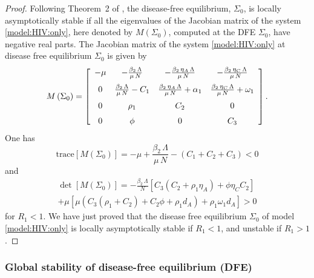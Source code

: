 \documentclass{my_aims}
\theoremstyle{definition}
\begin{document}
\begin{proof}
Following Theorem~2 of \cite{van:den:Driessche:2002}, the disease-free equilibrium,
$\Sigma_0$, is locally asymptotically stable if all the eigenvalues of the Jacobian
matrix of the system \eqref{model:HIV:only}, here denoted by $M\left(\Sigma_0\right)$,
computed at the DFE $\Sigma_0$, have negative real parts.
The Jacobian matrix of the system \eqref{model:HIV:only}
at disease free equilibrium $\Sigma_0$ is given by
\begin{equation}
\label{eq:Jacob:DFE}
M \left( \Sigma_0 \right)
= \left[ \begin {array}{cccc}
-\mu&-{\frac {\beta_2\,\Lambda}{\mu\,N}}
&-{\frac {\beta_2\,\eta_A\,\Lambda}{\mu\,N}}&-{\frac {\beta_2\,\eta_C\,
\Lambda}{\mu\,N}}\\ \noalign{\medskip}
0&{\frac {\beta_2\,\Lambda}{\mu
\,N}}-C_1&{\frac {\beta_2\,\eta_A\,\Lambda}{\mu\,N}}+
\alpha_1&{\frac {\beta_2\,\eta_C\,\Lambda}{\mu\,N}}+\omega_1
\\ \noalign{\medskip}
0&\rho_1&C_2&0\\ \noalign{\medskip}
0&\phi&0&C_3
\end {array} \right].
\end{equation}
One has
\begin{equation*}
\textrm{trace}\left[ M\left(\Sigma_0\right) \right] =
-\mu+{\frac {\beta_2\,\Lambda}{\mu\,N}}-(C_1 + C_2 + C_3) < 0
\end{equation*}
and
\begin{multline*}
\det \left[ M\left(\Sigma_0\right) \right] = -\frac{\beta_2\,\Lambda}{N}
\left[ C_3(C_2 + \rho_1 \eta_A) + \phi \eta_C C_2 \right]\\
+ \mu \left[ \mu \left(C_3(\rho_1 + C_2) + C_2 \phi + \rho_1 d_A \right)
+ \rho_1 \omega_1 d_A \right] > 0
\end{multline*}
for $R_1  < 1$.  We have just proved that the disease free equilibrium $\Sigma_0$ of model
\eqref{model:HIV:only} is locally asymptotically stable if $R_1 < 1$,
and unstable if $R_1 > 1$.
\end{proof}

\subsubsection{Global stability of disease-free equilibrium (DFE)}
\end{document}
